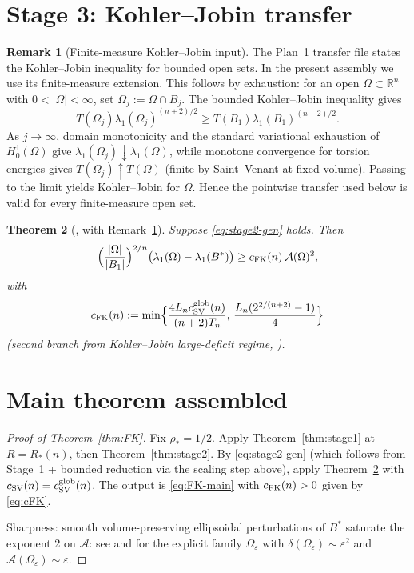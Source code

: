 \documentclass[11pt]{article}
\newtheorem{theorem}{Theorem}[section]
\theoremstyle{definition}
\newtheorem{remark}[theorem]{Remark}
\newcommand{\R}{\mathbb{R}}
\newcommand{\Fr}{\mathcal{A}}
\newcommand{\Om}{\Omega}
\newcommand{\eps}{\varepsilon}
\newcommand{\rstar}{\rho_{*}}
\newcommand{\Bstar}{B^{*}}
\begin{document}
\section{Stage 3: Kohler--Jobin transfer}\label{sec:stage3}

\begin{remark}[Finite-measure Kohler--Jobin input]\label{rem:finite-kj}
The Plan~1 transfer file states the Kohler--Jobin inequality for
bounded open sets. In the present assembly we use its finite-measure
extension. This follows by exhaustion: for an open
$\Om\subset\R^n$ with $0<|\Om|<\infty$, set
$\Om_j:=\Om\cap B_j$. The bounded Kohler--Jobin inequality gives
\[
  T(\Om_j)\lambda_1(\Om_j)^{(n+2)/2}\ge T(B_1)\lambda_1(B_1)^{(n+2)/2}.
\]
As $j\to\infty$, domain monotonicity and the standard variational
exhaustion of $H^1_0(\Om)$ give
$\lambda_1(\Om_j)\downarrow\lambda_1(\Om)$, while monotone convergence
for torsion energies gives $T(\Om_j)\uparrow T(\Om)$ (finite by
Saint--Venant at fixed volume). Passing to the limit yields
Kohler--Jobin for $\Om$. Hence the pointwise transfer used below is
valid for every finite-measure open set.
\end{remark}

\begin{theorem}[{\cite[Thm.~6.1]{KohlerJobinTransfer-Plan1}, with Remark~\ref{rem:finite-kj}}]\label{thm:stage3}
Suppose \eqref{eq:stage2-gen} holds. Then
\begin{equation}\label{eq:stage3}
   \Bigl(\frac{|\Om|}{|B_1|}\Bigr)^{2/n}
   \bigl(\lambda_1(\Om)-\lambda_1(\Bstar)\bigr)
   \ge c_{\rm FK}(n)\,\Fr(\Om)^2,
\end{equation}
with
\begin{equation}\label{eq:cFK}
   c_{\rm FK}(n):=\min\Bigl\{\frac{4L_n c_{\rm SV}^{\rm glob}(n)}{(n+2)T_n},\,\frac{L_n(2^{2/(n+2)}-1)}{4}\Bigr\}
\end{equation}
(second branch from Kohler--Jobin large-deficit regime,
\cite{KohlerJobinTransfer-Plan1}).
\end{theorem}

\section{Main theorem assembled}\label{sec:assembly}

\begin{proof}[Proof of Theorem~\ref{thm:FK}]
Fix $\rstar=1/2$. Apply Theorem~\ref{thm:stage1} at $R=R_*(n)$,
then Theorem~\ref{thm:stage2}. By \eqref{eq:stage2-gen} (which follows
from Stage~1 + bounded reduction via the scaling step above), apply
Theorem~\ref{thm:stage3} with $c_{\rm SV}(n) = c_{\rm SV}^{\rm glob}(n)$.
The output is \eqref{eq:FK-main} with $c_{\rm FK}(n)>0$ given by
\eqref{eq:cFK}.

Sharpness: smooth volume-preserving ellipsoidal perturbations of
$\Bstar$ saturate the exponent 2 on $\Fr$: see
\cite[Introduction]{BraDeP2017} and \cite[\S 1]{AKN} for the explicit
family $\Om_\eps$ with $\delta(\Om_\eps)\sim\eps^2$ and
$\Fr(\Om_\eps)\sim\eps$.
\end{proof}
\end{document}

